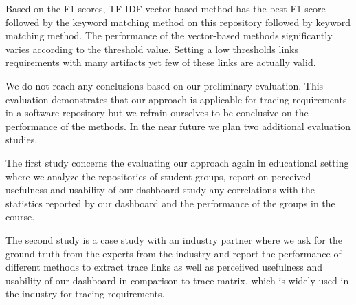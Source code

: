 Based on the F1-scores, TF-IDF vector based method has the best F1 score followed by the keyword matching method on this repository followed by keyword matching method. The performance of the vector-based methods  significantly varies according to the threshold value. Setting a low thresholds links requirements with many artifacts yet few of these links are actually valid.




We do not reach any conclusions based on our preliminary evaluation. This evaluation demonstrates that our approach is applicable for tracing requirements in a software repository but we refrain ourselves to be conclusive on the performance of the methods. In the near future we plan two additional evaluation studies.

The first study concerns the evaluating our approach again in educational setting where we analyze the repositories of student groups, report on perceived usefulness and usability of our dashboard study any correlations with the statistics reported by our dashboard and the performance of the groups in the course.

The second study is a case study with an industry partner where we ask for the ground truth from the experts from the industry and report the performance of different methods to extract trace links as well as perceiived usefulness and usability of our dashboard in comparison to trace matrix, which is widely used in the industry for tracing requirements.

